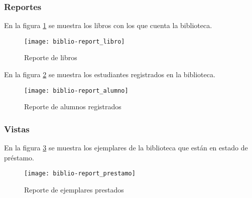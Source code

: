 \subsubsection{Reportes}
En la figura \ref{fig:biblio-report_libro} se muestra los libros con los que cuenta la biblioteca.
\begin{figure}[H]
  \centering
  \texttt{[image: biblio-report\_libro]}
  \caption{Reporte de libros}
  \label{fig:biblio-report_libro}
\end{figure}
En la figura \ref{fig:biblio-report_alumno} se muestra los estudiantes registrados en la biblioteca.
\begin{figure}[H]
  \centering
  \texttt{[image: biblio-report\_alumno]}
  \caption{Reporte de alumnos registrados}
  \label{fig:biblio-report_alumno}
\end{figure}
\subsubsection{Vistas}
En la figura \ref{fig:biblio-report_prestamo} se muestra los ejemplares de la biblioteca que están en estado de préstamo.
\begin{figure}[H]
  \centering
  \texttt{[image: biblio-report\_prestamo]}
  \caption{Reporte de ejemplares prestados}
  \label{fig:biblio-report_prestamo}
\end{figure}